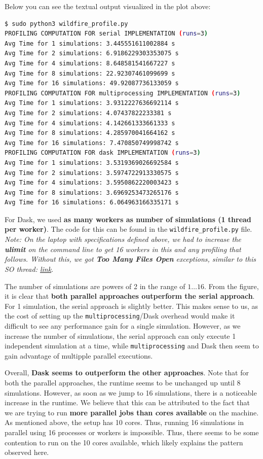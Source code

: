 \documentclass[a4paper,12pt]{article}
\begin{document}
Below you can see the textual output visualized in the plot above:

\begin{lstlisting}[language=bash,basicstyle=\tiny\ttfamily]
$ sudo python3 wildfire_profile.py
PROFILING COMPUTATION FOR serial IMPLEMENTATION (runs=3)
Avg Time for 1 simulations: 3.445551611002884 s 
Avg Time for 2 simulations: 6.9186229303353075 s 
Avg Time for 4 simulations: 8.648581541667227 s 
Avg Time for 8 simulations: 22.92307461099699 s 
Avg Time for 16 simulations: 49.92087736133059 s 
PROFILING COMPUTATION FOR multiprocessing IMPLEMENTATION (runs=3)
Avg Time for 1 simulations: 3.9312227636692114 s 
Avg Time for 2 simulations: 4.07437822233381 s 
Avg Time for 4 simulations: 4.142661333661333 s 
Avg Time for 8 simulations: 4.285970041664162 s 
Avg Time for 16 simulations: 7.470850749998742 s 
PROFILING COMPUTATION FOR dask IMPLEMENTATION (runs=3)
Avg Time for 1 simulations: 3.5319369026692584 s 
Avg Time for 2 simulations: 3.5974722913330575 s 
Avg Time for 4 simulations: 3.5950862220003423 s 
Avg Time for 8 simulations: 3.6969253473265176 s 
Avg Time for 16 simulations: 6.064963166335171 s 
\end{lstlisting}

For Dask, we used \textbf{as many workers as number of simulations (1 thread per worker)}. The code for this can be found in the \verb|wildfire_profile.py| file. \textit{Note: On the laptop with specifications defined above, we had to increase the \textbf{ulimit} on the command line to get 16 workers in this and any profiling that follows. Without this, we got \textbf{Too Many Files Open} exceptions, similar to this SO thread: \href{https://stackoverflow.com/questions/18280612/ioerror-errno-24-too-many-open-files}{link}}. 

The number of simulations are powers of 2 in the range of $1\dots16$. From the figure, it is clear that \textbf{both parallel approaches outperform the serial approach}. For 1 simulation, the serial approach is slightly better. This makes sense to us, as the cost of setting up the \verb|multiprocessing|/Dask overhead would make it difficult to see any performance gain for a single simulation. However, as we increase the number of simulations, the serial approach can only execute 1 independent simulation at a time, while \verb|multiprocessing| and Dask then seem to gain advantage of multipple parallel executions. 

Overall, \textbf{Dask seems to outperform the other approaches}. Note that for both the parallel approaches, the runtime seems to be unchanged up until 8 simulations. However, as soon as we jump to 16 simulations, there is a noticeable increase in the runtime. We believe that this can be attributed to the fact that we are trying to run \textbf{more parallel jobs than cores available} on the machine. As mentioned above, the setup has 10 cores. Thus, running 16 simulations in parallel using 16 processes or workers is impossible. Thus, there seems to be some contention to run on the 10 cores available, which likely explains the pattern observed here.
\end{document}
